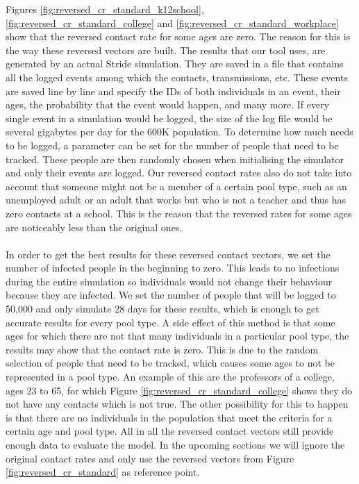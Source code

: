 Figures \ref{fig:reversed_cr_standard_k12school}, \ref{fig:reversed_cr_standard_college} and \ref{fig:reversed_cr_standard_workplace} show that the reversed contact rate for some ages are zero. The reason for this is the way these reversed vectors are built. The results that our tool uses, are generated by an actual Stride simulation. They are saved in a file that contains all the logged events among which the contacts, transmissions, etc. These events are saved line by line and specify the IDs of both individuals in an event, their ages, the probability that the event would happen, and many more. If every single event in a simulation would be logged, the size of the log file would be several gigabytes per day for the 600K population. To determine how much needs to be logged, a parameter can be set for the number of people that need to be tracked. These people are then randomly chosen when initialising the simulator and only their events are logged. Our reversed contact rates also do not take into account that someone might not be a member of a certain pool type, such as an unemployed adult or an adult that works but who is not a teacher and thus has zero contacts at a school. This is the reason that the reversed rates for some ages are noticeably less than the original ones.
\\\\
In order to get the best results for these reversed contact vectors, we set the number of infected people in the beginning to zero. This leads to no infections during the entire simulation so individuals would not change their behaviour because they are infected. We set the number of people that will be logged to 50,000 and only simulate 28 days for these results, which is enough to get accurate results for every pool type. A side effect of this method is that some ages for which there are not that many individuals in a particular pool type, the results may show that the contact rate is zero. This is due to the random selection of people that need to be tracked, which causes some ages to not be represented in a pool type. An example of this are the professors of a college, ages 23 to 65, for which Figure \ref{fig:reversed_cr_standard_college} shows they do not have any contacts which is not true. The other possibility for this to happen is that there are no individuals in the population that meet the criteria for a certain age and pool type. All in all the reversed contact vectors still provide enough data to evaluate the model. In the upcoming sections we will ignore the original contact rates and only use the reversed vectors from Figure \ref{fig:reversed_cr_standard} as reference point.

